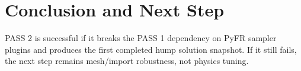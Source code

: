 \documentclass[11pt]{article}
\begin{document}
\section{Conclusion and Next Step}
PASS 2 is successful if it breaks the PASS 1 dependency on PyFR sampler plugins and produces the first completed hump solution snapshot. If it still fails, the next step remains mesh/import robustness, not physics tuning.



\end{document}
